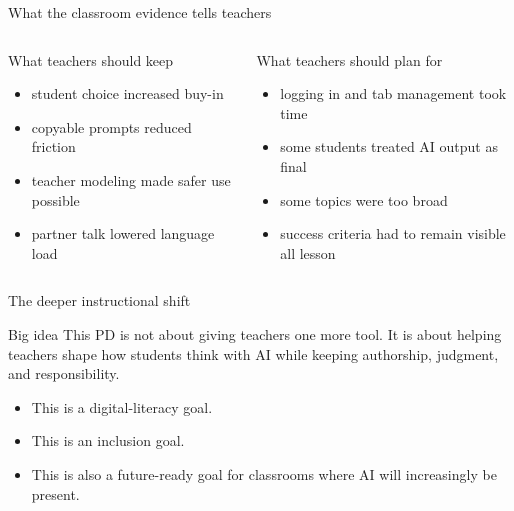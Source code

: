\documentclass[aspectratio=169,11pt]{beamer}
\newcommand{\bigidea}[1]{
  \begin{block}{Big idea}
  \Large #1
  \end{block}
}
\begin{document}
\begin{frame}{What the classroom evidence tells teachers}
\begin{columns}[T]
  \begin{block}{What teachers should keep}
  \begin{itemize}
    \item student choice increased buy-in
    \item copyable prompts reduced friction
    \item teacher modeling made safer use possible
    \item partner talk lowered language load
  \end{itemize}
  \end{block}

  \begin{block}{What teachers should plan for}
  \begin{itemize}
    \item logging in and tab management took time
    \item some students treated AI output as final
    \item some topics were too broad
    \item success criteria had to remain visible all lesson
  \end{itemize}
  \end{block}
\end{columns}
\end{frame}

\begin{frame}{The deeper instructional shift}
\bigidea{This PD is not about giving teachers one more tool. It is about helping teachers shape how students think with AI while keeping authorship, judgment, and responsibility.}

\vspace{0.2cm}
\begin{itemize}
  \item This is a digital-literacy goal.
  \item This is an inclusion goal.
  \item This is also a future-ready goal for classrooms where AI will increasingly be present.
\end{itemize}
\end{frame}
\end{document}
